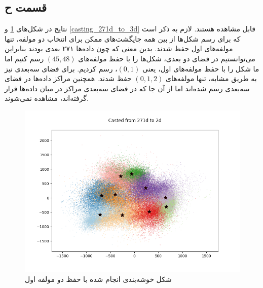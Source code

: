\documentclass[12pt, a4paper]{article}
\begin{document}
\clearpage

\subsection*{قسمت ح}

نتایج در شکل‌های \ref{casting_271d_to_2d} و \ref{casting_271d_to_3d}
قابل مشاهده هستند. لازم به ذکر است که برای رسم شکل‌ها از بین همه جایگشت‌های ممکن
برای انتخاب دو مولفه، تنها مولفه‌های اول حفظ شدند. بدین معنی که چون داده‌ها
۲۷۱ بعدی بودند بنابراین می‌توانستیم در فضای دو بعدی، شکل‌ها را با حفظ
مولفه‌های $(45,48)$ رسم کنیم اما ما شکل را با حفظ مولفه‌های اول، یعنی $(0,1)$، رسم
کردیم. برای فضای سه‌بعدی نیز به طریق مشابه، تنها مولفه‌های $(0,1,2)$ حفظ شدند.
همچنین مراکز داده‌ها در فضای سه‌بعدی رسم شده‌اند اما از آن جا که در فضای سه‌بعدی
مراکز در میان داده‌ها قرار گرفته‌اند، مشاهده نمی‌شوند.

\begin{figure}[h]
    \centering
    \includegraphics[width=0.4\linewidth]{images/q4/h/2d.png}
    \caption{شکل خوشه‌بندی انجام شده با حفظ دو مولفه اول}
    \label{casting_271d_to_2d}
\end{figure}
\end{document}

